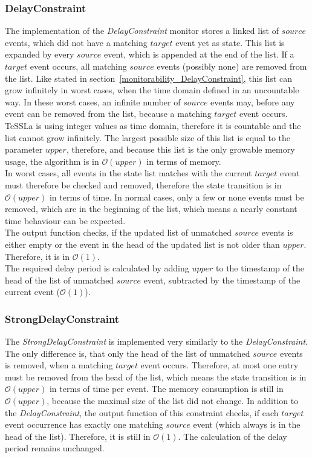 \subsubsection{DelayConstraint}
	The implementation of the \emph{DelayConstraint} monitor stores a linked list of $source$ events, which did not have a matching $target$ event yet as state. This list is expanded by every $source$ event, which is appended at the end of the list. If a $target$ event occurs, all matching $source$ events (possibly none) are removed from the list. Like stated in section~\ref{monitorability_DelayConstraint}, this list can grow infinitely in worst cases, when the time domain defined in an uncountable way. In these worst cases, an infinite number of $source$ events may, before any event can be removed from the list, because a matching $target$ event occurs.\\
	TeSSLa is using integer values as time domain, therefore it is countable and the list cannot grow infinitely. The largest possible size of this list is equal to the parameter $upper$, therefore, and because this list is the only growable memory usage, the algorithm is in $\mathcal{O}(upper)$ in terms of memory.\\
	In worst cases, all events in the state list matches with the current $target$ event must therefore be checked and removed, therefore the state transition is in $\mathcal{O}(upper)$ in terms of time. In normal cases, only a few or none events must be removed, which are in the beginning of the list, which means a nearly constant time behaviour can be expected.\\
	The output function checks, if the updated list of unmatched $source$ events is either empty or the event in the head of the updated list is not older than $upper$. Therefore, it is in $\mathcal{O}(1)$.\\
	The required delay period is calculated by adding $upper$ to the timestamp of the head of the list of unmatched $source$ event, subtracted by the timestamp of the current event ($\mathcal{O}(1)$).
	
\subsubsection{StrongDelayConstraint}
	The \emph{StrongDelayConstraint} is implemented very similarly to the \emph{DelayConstraint}. The only difference is, that only the head of the list of unmatched $source$ events is removed, when a matching $target$ event occurs. Therefore, at most one entry must be removed from the head of the list, which means the state transition is in $\mathcal{O}(upper)$ in terms of time per event. The memory consumption is still in $\mathcal{O}(upper)$, because the maximal size of the list did not change. In addition to the \textit{DelayConstraint}, the output function of this constraint checks, if each $target$ event occurrence has exactly one matching $source$ event (which always is in the head of the list). Therefore, it is still in $\mathcal{O}(1)$. The calculation of the delay period remains unchanged.
	
